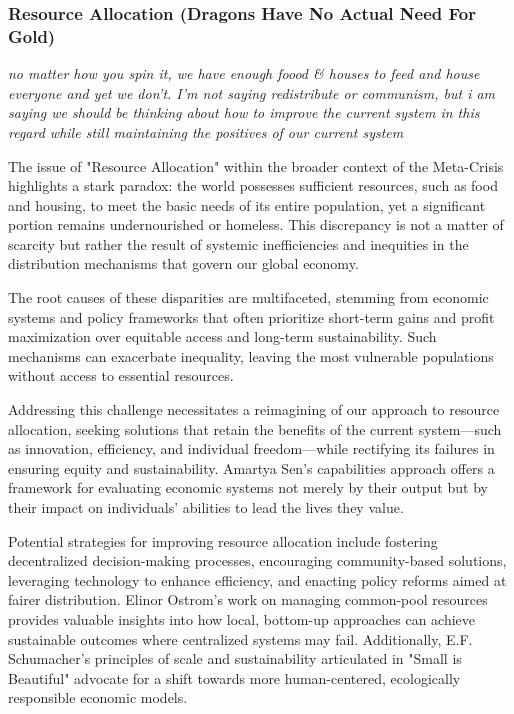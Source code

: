 \documentclass{article}
\begin{document}
\subsubsection{Resource Allocation (Dragons Have No Actual Need For Gold)}
\label{sec:ResourceAllocation}

\textit{no matter how you spin it, we have enough foood \& houses to feed and house everyone and yet we don't. I'm not saying redistribute or communism, but i am saying we should be thinking about how to improve the current system in this regard while still maintaining the positives of our current system}

The issue of "Resource Allocation" within the broader context of the Meta-Crisis highlights a stark paradox: the world possesses sufficient resources, such as food and housing, to meet the basic needs of its entire population, yet a significant portion remains undernourished or homeless\cite{FAO2019, UNHabitat2020}. This discrepancy is not a matter of scarcity but rather the result of systemic inefficiencies and inequities in the distribution mechanisms that govern our global economy\cite{Piketty2014}.

The root causes of these disparities are multifaceted, stemming from economic systems and policy frameworks that often prioritize short-term gains and profit maximization over equitable access and long-term sustainability. Such mechanisms can exacerbate inequality, leaving the most vulnerable populations without access to essential resources\cite{Piketty2014}.

Addressing this challenge necessitates a reimagining of our approach to resource allocation, seeking solutions that retain the benefits of the current system—such as innovation, efficiency, and individual freedom—while rectifying its failures in ensuring equity and sustainability. Amartya Sen's capabilities approach offers a framework for evaluating economic systems not merely by their output but by their impact on individuals' abilities to lead the lives they value\cite{Sen1999}.

Potential strategies for improving resource allocation include fostering decentralized decision-making processes, encouraging community-based solutions, leveraging technology to enhance efficiency, and enacting policy reforms aimed at fairer distribution. Elinor Ostrom's work on managing common-pool resources provides valuable insights into how local, bottom-up approaches can achieve sustainable outcomes where centralized systems may fail\cite{Ostrom1990}. Additionally, E.F. Schumacher's principles of scale and sustainability articulated in "Small is Beautiful" advocate for a shift towards more human-centered, ecologically responsible economic models\cite{Schumacher1973}.
\end{document}
